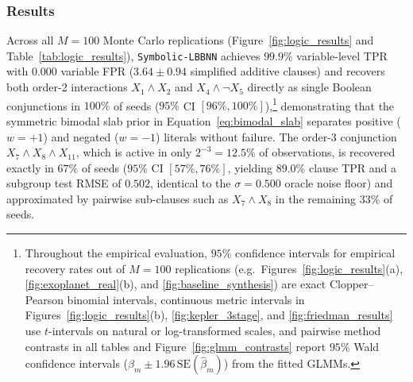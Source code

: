 \documentclass[11pt,a4paper]{article}
\begin{document}
\subsubsection{Results}
Across all $M = 100$ Monte Carlo replications (Figure~\ref{fig:logic_results} and Table~\ref{tab:logic_results}), \texttt{Symbolic-LBBNN} achieves $99.9\%$ variable-level TPR with $0.000$ variable FPR ($3.64 \pm 0.94$ simplified additive clauses) and recovers both order-2 interactions $X_1 \land X_2$ and $X_4 \land \neg X_5$ directly as single Boolean conjunctions in $100\%$ of seeds ($95\%$ CI $[96\%, 100\%]$),\footnote{Throughout the empirical evaluation, $95\%$ confidence intervals for empirical recovery rates out of $M = 100$ replications (e.g.\ Figures~\ref{fig:logic_results}(a), \ref{fig:exoplanet_real}(b), and \ref{fig:baseline_synthesis}) are exact Clopper--Pearson binomial intervals, continuous metric intervals in Figures~\ref{fig:logic_results}(b), \ref{fig:kepler_3stage}, and \ref{fig:friedman_results} use $t$-intervals on natural or log-transformed scales, and pairwise method contrasts in all tables and Figure~\ref{fig:glmm_contrasts} report $95\%$ Wald confidence intervals ($\hat{\beta}_m \pm 1.96\,\mathrm{SE}(\hat{\beta}_m)$) from the fitted GLMMs.} demonstrating that the symmetric bimodal slab prior in Equation~\eqref{eq:bimodal_slab} separates positive ($w = +1$) and negated ($w = -1$) literals without failure. The order-3 conjunction $X_7 \land X_8 \land X_{11}$, which is active in only $2^{-3} = 12.5\%$ of observations, is recovered exactly in $67\%$ of seeds ($95\%$ CI $[57\%, 76\%]$, yielding $89.0\%$ clause TPR and a subgroup test RMSE of $0.502$, identical to the $\sigma = 0.500$ oracle noise floor) and approximated by pairwise sub-clauses such as $X_7 \land X_8$ in the remaining $33\%$ of seeds.
\end{document}
